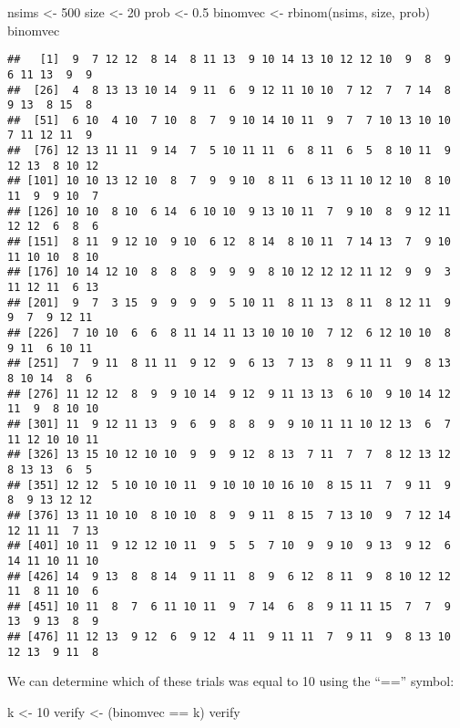 \documentclass[
]{book}
\newenvironment{Shaded}{\begin{snugshade}}{\end{snugshade}}
\newcommand{\DecValTok}[1]{\textcolor[rgb]{0.00,0.00,0.81}{#1}}
\newcommand{\FloatTok}[1]{\textcolor[rgb]{0.00,0.00,0.81}{#1}}
\newcommand{\FunctionTok}[1]{\textcolor[rgb]{0.00,0.00,0.00}{#1}}
\newcommand{\NormalTok}[1]{#1}
\newcommand{\OtherTok}[1]{\textcolor[rgb]{0.56,0.35,0.01}{#1}}
\newcommand{\SpecialCharTok}[1]{\textcolor[rgb]{0.00,0.00,0.00}{#1}}
\begin{document}
\begin{Shaded}
\begin{Highlighting}[]
\NormalTok{nsims }\OtherTok{\textless{}{-}} \DecValTok{500}
\NormalTok{size }\OtherTok{\textless{}{-}} \DecValTok{20}
\NormalTok{prob }\OtherTok{\textless{}{-}} \FloatTok{0.5}
\NormalTok{binomvec }\OtherTok{\textless{}{-}} \FunctionTok{rbinom}\NormalTok{(nsims, size, prob)}
\NormalTok{binomvec}
\end{Highlighting}
\end{Shaded}

\begin{verbatim}
##   [1]  9  7 12 12  8 14  8 11 13  9 10 14 13 10 12 12 10  9  8  9  6 11 13  9  9
##  [26]  4  8 13 13 10 14  9 11  6  9 12 11 10 10  7 12  7  7 14  8  9 13  8 15  8
##  [51]  6 10  4 10  7 10  8  7  9 10 14 10 11  9  7  7 10 13 10 10  7 11 12 11  9
##  [76] 12 13 11 11  9 14  7  5 10 11 11  6  8 11  6  5  8 10 11  9 12 13  8 10 12
## [101] 10 10 13 12 10  8  7  9  9 10  8 11  6 13 11 10 12 10  8 10 11  9  9 10  7
## [126] 10 10  8 10  6 14  6 10 10  9 13 10 11  7  9 10  8  9 12 11 12 12  6  8  6
## [151]  8 11  9 12 10  9 10  6 12  8 14  8 10 11  7 14 13  7  9 10 11 10 10  8 10
## [176] 10 14 12 10  8  8  8  9  9  9  8 10 12 12 12 11 12  9  9  3 11 12 11  6 13
## [201]  9  7  3 15  9  9  9  9  5 10 11  8 11 13  8 11  8 12 11  9  9  7  9 12 11
## [226]  7 10 10  6  6  8 11 14 11 13 10 10 10  7 12  6 12 10 10  8  9 11  6 10 11
## [251]  7  9 11  8 11 11  9 12  9  6 13  7 13  8  9 11 11  9  8 13  8 10 14  8  6
## [276] 11 12 12  8  9  9 10 14  9 12  9 11 13 13  6 10  9 10 14 12 11  9  8 10 10
## [301] 11  9 12 11 13  9  6  9  8  8  9  9 10 11 11 10 12 13  6  7 11 12 10 10 11
## [326] 13 15 10 12 10 10  9  9  9 12  8 13  7 11  7  7  8 12 13 12  8 13 13  6  5
## [351] 12 12  5 10 10 10 11  9 10 10 10 16 10  8 15 11  7  9 11  9  8  9 13 12 12
## [376] 13 11 10 10  8 10 10  8  9  9 11  8 15  7 13 10  9  7 12 14 12 11 11  7 13
## [401] 10 11  9 12 12 10 11  9  5  5  7 10  9  9 10  9 13  9 12  6 14 11 10 11 10
## [426] 14  9 13  8  8 14  9 11 11  8  9  6 12  8 11  9  8 10 12 12 11  8 11 10  6
## [451] 10 11  8  7  6 11 10 11  9  7 14  6  8  9 11 11 15  7  7  9 13  9 13  8  9
## [476] 11 12 13  9 12  6  9 12  4 11  9 11 11  7  9 11  9  8 13 10 12 13  9 11  8
\end{verbatim}

We can determine which of these trials was equal to 10 using the ``=='' symbol:

\begin{Shaded}
\begin{Highlighting}[]
\NormalTok{k }\OtherTok{\textless{}{-}} \DecValTok{10}
\NormalTok{verify }\OtherTok{\textless{}{-}}\NormalTok{ (binomvec }\SpecialCharTok{==}\NormalTok{ k)}
\NormalTok{verify}
\end{Highlighting}
\end{Shaded}
\end{document}

